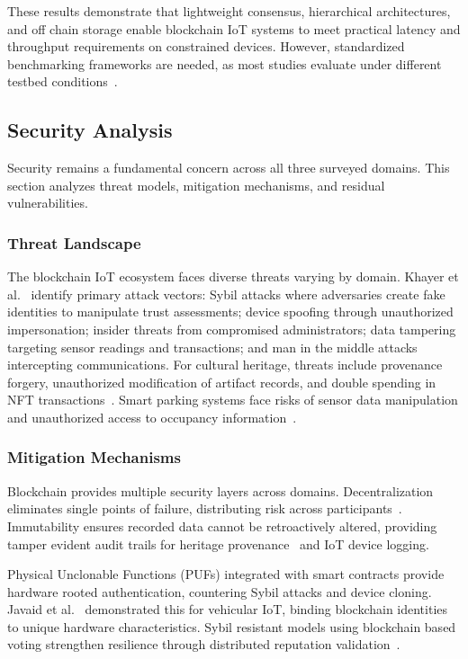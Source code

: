 \documentclass[conference]{IEEEtran}
\begin{document}
These results demonstrate that lightweight consensus, hierarchical architectures, and off chain storage enable blockchain IoT systems to meet practical latency and throughput requirements on constrained devices. However, standardized benchmarking frameworks are needed, as most studies evaluate under different testbed conditions~\cite{b1}.

\subsection{Security Analysis}

Security remains a fundamental concern across all three surveyed domains. This section analyzes threat models, mitigation mechanisms, and residual vulnerabilities.

\subsubsection{Threat Landscape}

The blockchain IoT ecosystem faces diverse threats varying by domain. Khayer et al.~\cite{b1} identify primary attack vectors: Sybil attacks where adversaries create fake identities to manipulate trust assessments; device spoofing through unauthorized impersonation; insider threats from compromised administrators; data tampering targeting sensor readings and transactions; and man in the middle attacks intercepting communications. For cultural heritage, threats include provenance forgery, unauthorized modification of artifact records, and double spending in NFT transactions~\cite{b2}. Smart parking systems face risks of sensor data manipulation and unauthorized access to occupancy information~\cite{b3}.

\subsubsection{Mitigation Mechanisms}

Blockchain provides multiple security layers across domains. Decentralization eliminates single points of failure, distributing risk across participants~\cite{b1}. Immutability ensures recorded data cannot be retroactively altered, providing tamper evident audit trails for heritage provenance~\cite{b2} and IoT device logging.

Physical Unclonable Functions (PUFs) integrated with smart contracts provide hardware rooted authentication, countering Sybil attacks and device cloning. Javaid et al.~\cite{b4} demonstrated this for vehicular IoT, binding blockchain identities to unique hardware characteristics. Sybil resistant models using blockchain based voting strengthen resilience through distributed reputation validation~\cite{b5}.
\end{document}
